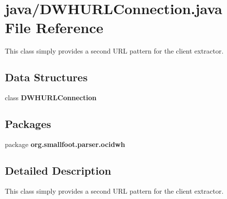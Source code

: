 \section{java/\+D\+W\+H\+U\+R\+L\+Connection.java File Reference}
\label{DWHURLConnection_8java}


This class simply provides a second U\+R\+L pattern for the client extractor.  


\subsection*{Data Structures}
\begin{DoxyCompactItemize}
\item 
class {\bf D\+W\+H\+U\+R\+L\+Connection}
\end{DoxyCompactItemize}
\subsection*{Packages}
\begin{DoxyCompactItemize}
\item 
package {\bf org.\+smallfoot.\+parser.\+ocidwh}
\end{DoxyCompactItemize}


\subsection{Detailed Description}
This class simply provides a second U\+R\+L pattern for the client extractor. 

